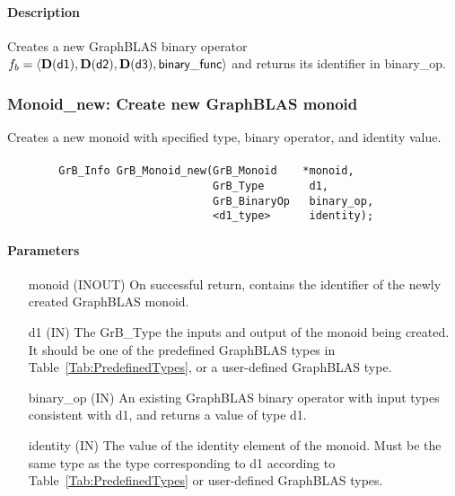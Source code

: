 \paragraph{Description}

Creates a new GraphBLAS binary operator $f_b = \langle \bold{D}({\sf d1}), 
\bold{D}({\sf d2}), \bold{D}({\sf d3}), {\sf binary\_func} \rangle$ and returns its identifier in {\sf binary\_op}.



\subsubsection{{\sf Monoid\_new}: Create new GraphBLAS monoid}

Creates a new monoid with specified type, binary operator, and identity value.

\paragraph{\syntax}

\begin{verbatim}
        GrB_Info GrB_Monoid_new(GrB_Monoid    *monoid,
                                GrB_Type       d1,
                                GrB_BinaryOp   binary_op,
                                <d1_type>      identity);
\end{verbatim}

\paragraph{Parameters}

\begin{itemize}[leftmargin=1.1in]
    \item[{\sf monoid}] ({\sf INOUT}) On successful return, contains the identifier 
    of the newly created GraphBLAS monoid.
    \item[{\sf d1}] ({\sf IN}) The {\sf GrB\_Type} the inputs and output of the 
    monoid being created. It should be one of the predefined GraphBLAS types in
    Table~\ref{Tab:PredefinedTypes}, or a user-defined GraphBLAS type.
    \item[{\sf binary\_op}] ({\sf IN}) An existing GraphBLAS binary operator with input types 
    consistent with {\sf d1}, and returns a value of type {\sf d1}. 
    \item[{\sf identity}]  ({\sf IN}) The value of the identity element of the 
    monoid. Must be the same type as the type corresponding to {\sf d1} according to
    Table~\ref{Tab:PredefinedTypes} or user-defined GraphBLAS types.
\end{itemize}

